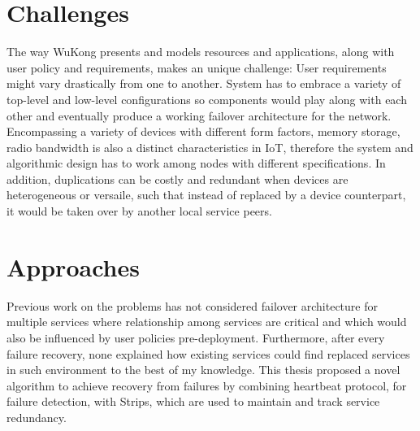 \section{Challenges}

The way WuKong presents and models resources and applications, along with user
policy and requirements, makes an unique challenge: User requirements might
vary drastically from one to another. System has to embrace a variety of
top-level and low-level configurations so components would play along with each
other and eventually produce a working failover architecture for the network.
Encompassing a variety of devices with different form factors, memory storage,
radio bandwidth is also a distinct characteristics in IoT,
therefore the system and algorithmic design has to work among nodes
with different specifications. In addition, duplications can be
costly and redundant when devices are heterogeneous or versaile,
such that instead of replaced by a device counterpart, it would be
taken over by another local service peers.



\section{Approaches}

Previous work on the problems has not considered failover architecture for
multiple services where relationship among services are critical and which would
also be influenced by user policies pre-deployment. Furthermore, after every
failure recovery, none explained how existing services could find replaced
services in such environment to the best of my knowledge. This thesis proposed
a novel algorithm to achieve recovery from failures by combining heartbeat
protocol, for failure detection, with Strips, which are used to maintain and
track service redundancy. 

